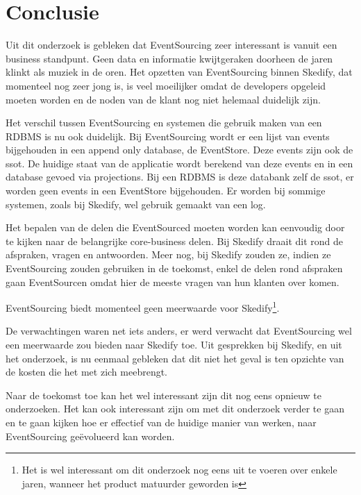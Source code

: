 
\chapter{Conclusie}
\label{ch:conclusie}


Uit dit onderzoek is gebleken dat EventSourcing zeer interessant is vanuit een business standpunt. Geen data en informatie kwijtgeraken doorheen de jaren klinkt als muziek in de oren. Het opzetten van EventSourcing binnen Skedify, dat momenteel nog zeer jong is, is veel moeilijker omdat de developers opgeleid moeten worden en de noden van de klant nog niet helemaal duidelijk zijn.

Het verschil tussen EventSourcing en systemen die gebruik maken van een \gls{RDBMS} is nu ook duidelijk. Bij EventSourcing wordt er een lijst van events bijgehouden in een append only database, de EventStore. Deze events zijn ook de \gls{ssot}. De huidige staat van de applicatie wordt berekend van deze events en in een database gevoed via projections. Bij een \gls{RDBMS} is deze databank zelf de \gls{ssot}, er worden geen events in een EventStore bijgehouden. Er worden bij sommige systemen, zoals bij Skedify, wel gebruik gemaakt van een log.

Het bepalen van de delen die EventSourced moeten worden kan eenvoudig door te kijken naar de belangrijke core-business delen. Bij Skedify draait dit rond de afspraken, vragen en antwoorden. Meer nog, bij Skedify zouden ze, indien ze EventSourcing zouden gebruiken in de toekomst, enkel de delen rond afspraken gaan EventSourcen omdat hier de meeste vragen van hun klanten over komen.

EventSourcing biedt momenteel geen meerwaarde voor Skedify\footnote{Het is wel interessant om dit onderzoek nog eens uit te voeren over enkele jaren, wanneer het product matuurder geworden is}.

De verwachtingen waren net iets anders, er werd verwacht dat EventSourcing wel een meerwaarde zou bieden naar Skedify toe. Uit gesprekken bij Skedify, en uit het onderzoek, is nu eenmaal gebleken dat dit niet het geval is ten opzichte van de kosten die het met zich meebrengt.

Naar de toekomst toe kan het wel interessant zijn dit nog eens opnieuw te onderzoeken. Het kan ook interessant zijn om met dit onderzoek verder te gaan en te gaan kijken hoe er effectief van de huidige manier van werken, naar EventSourcing geëvolueerd kan worden.